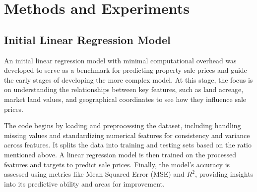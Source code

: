 \section{Methods and Experiments}
\label{sec:headings}

\subsection{Initial Linear Regression Model}

An initial linear regression model with minimal computational overhead was developed to serve as a benchmark for predicting property sale prices and guide the early stages of developing the more complex model. At this stage, the focus is on understanding the relationships between key features, such as land acreage, market land values, and geographical coordinates to see how they influence sale prices. 

The code begins by loading and preprocessing the dataset, including handling missing values and standardizing numerical features for consistency and variance across features. It splits the data into training and testing sets based on the ratio mentioned above. A linear regression model is then trained on the processed features and targets to predict sale prices. Finally, the model's accuracy is assessed using metrics like Mean Squared Error (MSE) and $R^2$, providing insights into its predictive ability and areas for improvement.